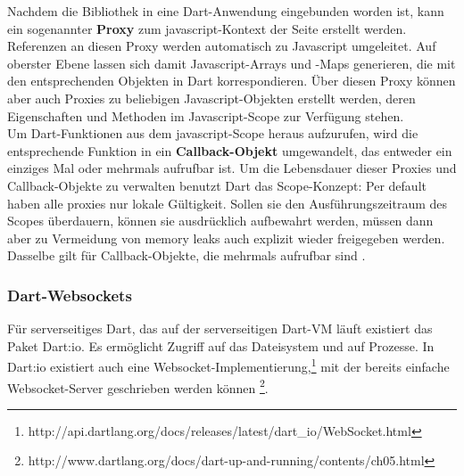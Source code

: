 Nachdem die Bibliothek in eine Dart-Anwendung eingebunden worden ist, kann ein sogenannter {\bf Proxy} zum javascript-Kontext der Seite erstellt werden. Referenzen an diesen Proxy werden automatisch zu Javascript umgeleitet. Auf oberster Ebene lassen sich damit Javascript-Arrays und -Maps generieren, die mit den entsprechenden Objekten in Dart korrespondieren. Über diesen Proxy können aber auch Proxies zu beliebigen Javascript-Objekten erstellt werden, deren Eigenschaften und Methoden im Javascript-Scope zur Verfügung stehen.\\

Um Dart-Funktionen aus dem javascript-Scope heraus aufzurufen, wird die entsprechende Funktion in ein {\bf Callback-Objekt} umgewandelt, das entweder ein einziges Mal oder mehrmals aufrufbar ist. Um die Lebensdauer dieser Proxies und Callback-Objekte zu verwalten benutzt Dart das Scope-Konzept: Per default haben alle proxies nur lokale Gültigkeit. Sollen sie den Ausführungszeitraum des Scopes überdauern, können sie ausdrücklich aufbewahrt werden, müssen dann aber zu Vermeidung von memory leaks auch explizit wieder freigegeben werden. Dasselbe gilt für Callback-Objekte, die mehrmals aufrufbar sind \cite{js-interop}.

\subsubsection{Dart-Websockets}
Für serverseitiges Dart, das auf der serverseitigen Dart-VM läuft existiert das Paket Dart:io. Es ermöglicht Zugriff auf das Dateisystem und auf Prozesse. In Dart:io existiert auch eine Websocket-Implementierung,\footnote{http://api.dartlang.org/docs/releases/latest/dart\_io/WebSocket.html} mit der bereits einfache Websocket-Server geschrieben werden können \footnote{http://www.dartlang.org/docs/dart-up-and-running/contents/ch05.html}.
